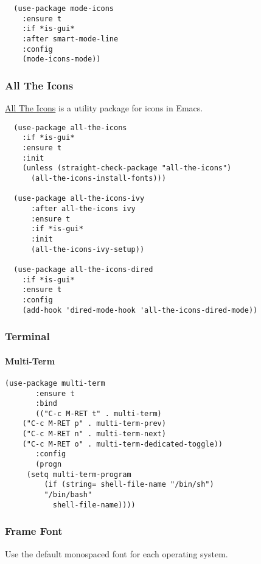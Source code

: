 \documentclass[11pt]{article}
\begin{document}
\begin{verbatim}
  (use-package mode-icons
    :ensure t
    :if *is-gui*
    :after smart-mode-line
    :config
    (mode-icons-mode))
\end{verbatim}

\subsubsection*{All The Icons}
\label{sec:org56c5fc9}

\href{https://github.com/domtronn/all-the-icons.el}{All The Icons} is a utility package for icons in Emacs.

\begin{verbatim}
  (use-package all-the-icons
    :if *is-gui*
    :ensure t
    :init
    (unless (straight-check-package "all-the-icons")
      (all-the-icons-install-fonts)))

  (use-package all-the-icons-ivy
      :after all-the-icons ivy
      :ensure t
      :if *is-gui*
      :init
      (all-the-icons-ivy-setup))

  (use-package all-the-icons-dired
    :if *is-gui*
    :ensure t
    :config
    (add-hook 'dired-mode-hook 'all-the-icons-dired-mode))
\end{verbatim}

\subsubsection*{Terminal}
\label{sec:orgcb06822}
\paragraph*{Multi-Term}
\label{sec:orgddaffe8}

\begin{verbatim}
(use-package multi-term
       :ensure t
       :bind
       (("C-c M-RET t" . multi-term)
	("C-c M-RET p" . multi-term-prev)
	("C-c M-RET n" . multi-term-next)
	("C-c M-RET o" . multi-term-dedicated-toggle))
       :config
       (progn
	 (setq multi-term-program
	     (if (string= shell-file-name "/bin/sh")
		 "/bin/bash"
	       shell-file-name))))
\end{verbatim}

\subsubsection*{Frame Font}
\label{sec:org8425f88}

Use the default monospaced font for each operating system.
\end{document}
